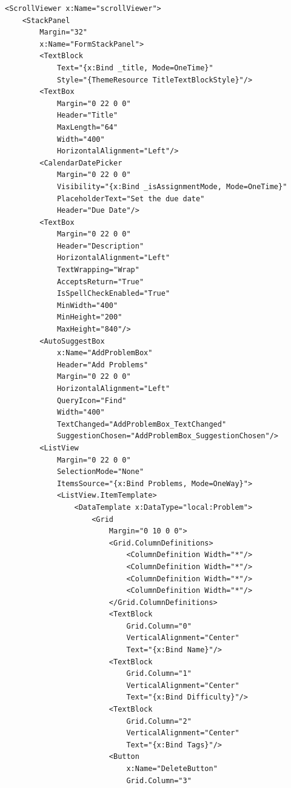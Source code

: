 \documentclass[a4paper]{report}
\begin{document}
\begin{verbatim}
<ScrollViewer x:Name="scrollViewer">
    <StackPanel
        Margin="32"
        x:Name="FormStackPanel">
        <TextBlock
            Text="{x:Bind _title, Mode=OneTime}"
            Style="{ThemeResource TitleTextBlockStyle}"/>
        <TextBox
            Margin="0 22 0 0"
            Header="Title"
            MaxLength="64"
            Width="400"
            HorizontalAlignment="Left"/>
        <CalendarDatePicker 
            Margin="0 22 0 0"
            Visibility="{x:Bind _isAssignmentMode, Mode=OneTime}"
            PlaceholderText="Set the due date" 
            Header="Due Date"/>
        <TextBox
            Margin="0 22 0 0"
            Header="Description"
            HorizontalAlignment="Left"
            TextWrapping="Wrap" 
            AcceptsReturn="True" 
            IsSpellCheckEnabled="True"
            MinWidth="400"
            MinHeight="200"
            MaxHeight="840"/>
        <AutoSuggestBox
            x:Name="AddProblemBox"
            Header="Add Problems"
            Margin="0 22 0 0"
            HorizontalAlignment="Left"
            QueryIcon="Find"
            Width="400"
            TextChanged="AddProblemBox_TextChanged"
            SuggestionChosen="AddProblemBox_SuggestionChosen"/>
        <ListView
            Margin="0 22 0 0"
            SelectionMode="None"
            ItemsSource="{x:Bind Problems, Mode=OneWay}">
            <ListView.ItemTemplate>
                <DataTemplate x:DataType="local:Problem">
                    <Grid
                        Margin="0 10 0 0">
                        <Grid.ColumnDefinitions>
                            <ColumnDefinition Width="*"/>
                            <ColumnDefinition Width="*"/>
                            <ColumnDefinition Width="*"/>
                            <ColumnDefinition Width="*"/>
                        </Grid.ColumnDefinitions>
                        <TextBlock
                            Grid.Column="0"
                            VerticalAlignment="Center"
                            Text="{x:Bind Name}"/>
                        <TextBlock
                            Grid.Column="1"
                            VerticalAlignment="Center"
                            Text="{x:Bind Difficulty}"/>
                        <TextBlock
                            Grid.Column="2"
                            VerticalAlignment="Center"
                            Text="{x:Bind Tags}"/>
                        <Button
                            x:Name="DeleteButton"
                            Grid.Column="3"

\end{verbatim}
\end{document}
